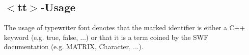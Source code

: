 \subsection*{$<$tt$>$-\/\+Usage }

The usage of typewriter font denotes that the marked identifier is either a C++ keyword (e.\+g. {\ttfamily true}, {\ttfamily false}, ...) or that it is a term coined by the S\+W\+F documentation (e.\+g. {\ttfamily M\+A\+T\+R\+I\+X}, {\ttfamily Character}, ...). 